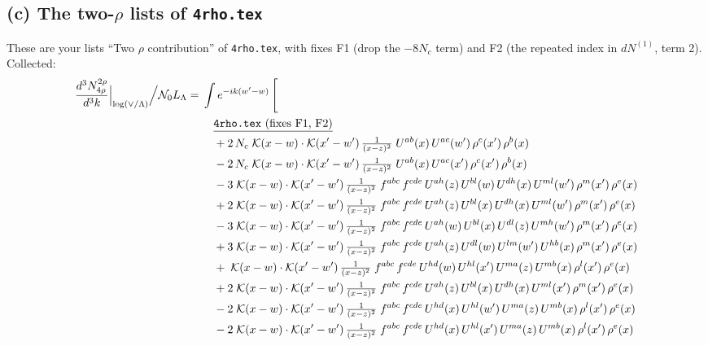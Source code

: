 \documentclass[10pt]{article}
\numberwithin{equation}{section}
\newcommand{\NO}{\mathcal N_0}
\newcommand{\LL}{L_\Lambda}
\begin{document}
\subsection{(c) The two-\texorpdfstring{$\rho$}{rho} lists of \texttt{4rho.tex}}
These are your lists ``Two $\rho$ contribution'' of \texttt{4rho.tex}, with fixes F1 (drop the $-8N_c$ term) and F2 (the repeated index in $dN^{(1)}$, term 2). Collected:
\begin{align}
\frac{d^3N^{2\rho}_{\rm 4\rho}}{d^3k}\Big|_{\log(\vee/\Lambda)}\Big/\NO\LL={}&\int e^{-ik(w'-w)}\,\Bigg[\notag\\
&\quad\underline{\text{\texttt{4rho.tex} (fixes F1, F2)}}\notag\\
&\quad +2\,N_c\;\mathcal{K}(x-w)\cdot\mathcal{K}(x'-w')\,\tfrac{1}{(x-z)^{2}}\;U^{ab}(x)\,U^{ac}(w')\,\rho^{c}(x')\,\rho^{b}(x)\notag\\
&\quad -2\,N_c\;\mathcal{K}(x-w)\cdot\mathcal{K}(x'-w')\,\tfrac{1}{(x-z)^{2}}\;U^{ab}(x)\,U^{ac}(x')\,\rho^{c}(x')\,\rho^{b}(x)\notag\\
&\quad -3\;\mathcal{K}(x-w)\cdot\mathcal{K}(x'-w')\,\tfrac{1}{(x-z)^{2}}\;f^{abc}\,f^{cde}\,U^{ah}(z)\,U^{bl}(w)\,U^{dh}(x)\,U^{ml}(w')\,\rho^{m}(x')\,\rho^{e}(x)\notag\\
&\quad +2\;\mathcal{K}(x-w)\cdot\mathcal{K}(x'-w')\,\tfrac{1}{(x-z)^{2}}\;f^{abc}\,f^{cde}\,U^{ah}(z)\,U^{bl}(x)\,U^{dh}(x)\,U^{ml}(w')\,\rho^{m}(x')\,\rho^{e}(x)\notag\\
&\quad -3\;\mathcal{K}(x-w)\cdot\mathcal{K}(x'-w')\,\tfrac{1}{(x-z)^{2}}\;f^{abc}\,f^{cde}\,U^{ah}(w)\,U^{bl}(x)\,U^{dl}(z)\,U^{mh}(w')\,\rho^{m}(x')\,\rho^{e}(x)\notag\\
&\quad +3\;\mathcal{K}(x-w)\cdot\mathcal{K}(x'-w')\,\tfrac{1}{(x-z)^{2}}\;f^{abc}\,f^{cde}\,U^{ah}(z)\,U^{dl}(w)\,U^{lm}(w')\,U^{hb}(x)\,\rho^{m}(x')\,\rho^{e}(x)\notag\\
&\quad +\;\mathcal{K}(x-w)\cdot\mathcal{K}(x'-w')\,\tfrac{1}{(x-z)^{2}}\;f^{abc}\,f^{cde}\,U^{hd}(w)\,U^{hl}(x')\,U^{ma}(z)\,U^{mb}(x)\,\rho^{l}(x')\,\rho^{e}(x)\notag\\
&\quad +2\;\mathcal{K}(x-w)\cdot\mathcal{K}(x'-w')\,\tfrac{1}{(x-z)^{2}}\;f^{abc}\,f^{cde}\,U^{ah}(z)\,U^{bl}(x)\,U^{dh}(x)\,U^{ml}(x')\,\rho^{m}(x')\,\rho^{e}(x)\notag\\
&\quad -2\;\mathcal{K}(x-w)\cdot\mathcal{K}(x'-w')\,\tfrac{1}{(x-z)^{2}}\;f^{abc}\,f^{cde}\,U^{hd}(x)\,U^{hl}(w')\,U^{ma}(z)\,U^{mb}(x)\,\rho^{l}(x')\,\rho^{e}(x)\notag\\
&\quad -2\;\mathcal{K}(x-w)\cdot\mathcal{K}(x'-w')\,\tfrac{1}{(x-z)^{2}}\;f^{abc}\,f^{cde}\,U^{hd}(x)\,U^{hl}(x')\,U^{ma}(z)\,U^{mb}(x)\,\rho^{l}(x')\,\rho^{e}(x)\notag\\

\end{align}
\end{document}
